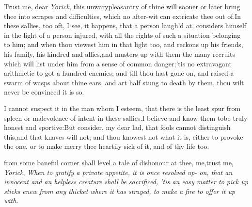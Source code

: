 \documentclass{article}
\begin{document}
Trust me, dear \textit{Yorick}, this unwary\break pleasantry of thine
will sooner or later bring thee into scrapes and difficulties,
which no after-wit can extricate thee out of.\tsh In these
sallies, too oft, I see, it happens, that a person laugh’d at,
considers himself in the light of a person injured, with all the
rights of such a situa\-tion belonging to him; and when thou viewest
him in that light too, and rec\-kons up his friends, his family, his
kindred and allies,\tsk and musters up with them the many
recruits which will list under him from a sense of common
danger;\tsk ’tis no extravagant arithmetic to
got a hundred enemies; and till
thou hast gone on, and raised a swarm of wasps about thine ears,
and art half stung to death by them, thou wilt never be
convinced it is so.

I cannot suspect it in the man whom I esteem, that there is the
least spur from spleen or malevolence of intent in these
sallies.\tsh I believe and know them to\break be truly honest and
sportive:\tsk But consider, my dear lad, that fools cannot
di\-stinguish this,\tsk and that knaves will not; and thou knowest
not what it is, either to provoke the one, or to make merry 
thee heartily sick of it, and of thy life too.

 from some baneful corner shall level a tale of dishonour at
thee,
me,\tsk trust me, \textit{Yorick}, \textit{When to gratify\break
a private appetite, it is once resolved up-\break
on, that an innocent and an helpless creature\break
shall be sacrificed, ’tis an easy matter to pick\break
up sticks enew from any thicket where it has\break
strayed, to make a fire to offer it up with.}
\end{document}
